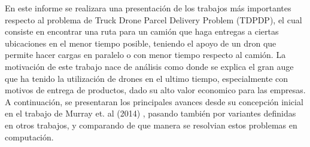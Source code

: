 
En este informe se realizara una presentación de los trabajos más importantes respecto al problema de Truck Drone Parcel Delivery Problem (TDPDP), el cual consiste en encontrar una ruta para un camión que haga entregas a ciertas ubicaciones en el menor tiempo posible, teniendo el apoyo de un dron que permite hacer cargas en paralelo o con menor tiempo respecto al camión. 
La motivación de este trabajo nace de análisis como \cite{moshrefjavadi2021applications} donde se explica el gran auge que ha tenido la utilización de drones en el ultimo tiempo, especialmente con motivos de entrega de productos, dado su alto valor economico para las empresas.
A continuación, se presentaran los principales avances desde su concepción inicial en el trabajo de Murray et. al (2014) \cite{Murray2015Flying}, pasando también por variantes definidas en otros trabajos, y comparando de que manera se resolvian estos problemas en computación.
